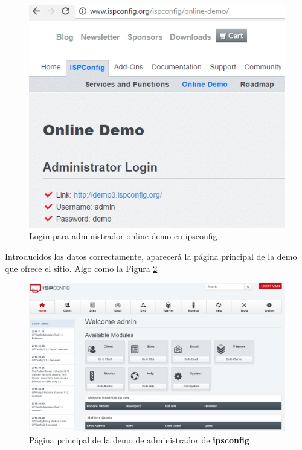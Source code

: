 \begin{figure}[H] %
	\centering
	\includegraphics[scale=0.6]{figuras/figura58.png} 
	\caption{Login para administrador online demo en ipsconfig} 
	\label{fig:figura58}
\end{figure}

Introducidos los datos correctamente, aparecerá la página principal de la demo que ofrece el sitio. Algo como la Figura \ref{fig:figura59}

\begin{figure}[H] %
	\centering
	\includegraphics[scale=0.4]{figuras/figura59.png} 
	\caption{Página principal de la demo de administrador de \textbf{ipsconfig}} 
	\label{fig:figura59}
\end{figure}

